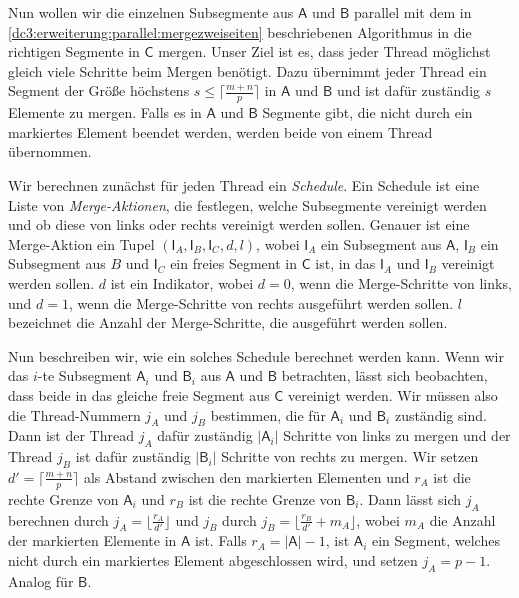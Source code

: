 Nun wollen wir die einzelnen Subsegmente aus $\mathsf{A}$ und $\mathsf{B}$ parallel mit dem in \cref{dc3:erweiterung:parallel:mergezweiseiten} beschriebenen Algorithmus in die richtigen Segmente in $\mathsf{C}$ mergen. Unser Ziel ist es, dass jeder Thread möglichst gleich viele Schritte beim Mergen benötigt. Dazu übernimmt jeder Thread ein Segment der Größe höchstens $s \le \lceil \frac{m+n}{p} \rceil$ in $\mathsf{A}$ und $\mathsf{B}$ und ist dafür zuständig $s$ Elemente zu mergen. Falls es in $\mathsf{A}$ und $\mathsf{B}$ Segmente gibt, die nicht durch ein markiertes Element beendet werden, werden beide von einem Thread übernommen. \par
Wir berechnen zunächst für jeden Thread ein \textit{Schedule}. Ein Schedule ist eine Liste von \textit{Merge-Aktionen}, die festlegen, welche Subsegmente vereinigt werden und ob diese von links oder rechts vereinigt werden sollen. Genauer ist eine Merge-Aktion ein Tupel $(\mathsf{I}_A, \mathsf{I}_B, \mathsf{I}_C, d, l)$, wobei $\mathsf{I}_A$ ein Subsegment aus $\mathsf{A}$, $\mathsf{I}_B$ ein Subsegment aus $B$ und $\mathsf{I}_C$ ein freies Segment in $\mathsf{C}$ ist, in das $\mathsf{I}_A$ und $\mathsf{I}_B$ vereinigt werden sollen. $d$ ist ein Indikator, wobei $d = 0$, wenn die Merge-Schritte von links, und $d = 1$, wenn die Merge-Schritte von rechts ausgeführt werden sollen. $l$ bezeichnet die Anzahl der Merge-Schritte, die ausgeführt werden sollen. \par
Nun beschreiben wir, wie ein solches Schedule berechnet werden kann. Wenn wir das $i$-te Subsegment $\mathsf{A}_i$ und $\mathsf{B}_i$ aus $\mathsf{A}$ und $\mathsf{B}$ betrachten, lässt sich beobachten, dass beide in das gleiche freie Segment aus $\mathsf{C}$ vereinigt werden. Wir müssen also die Thread-Nummern $j_A$ und $j_B$ bestimmen, die für $\mathsf{A}_i$ und $\mathsf{B}_i$ zuständig sind. Dann ist der Thread $j_A$ dafür zuständig $|\mathsf{A}_i|$ Schritte von links zu mergen und der Thread $j_B$ ist dafür zuständig $|\mathsf{B}_i|$ Schritte von rechts zu mergen. Wir setzen $d' = \lceil \frac{m+n}{p} \rceil$ als Abstand zwischen den markierten Elementen und $r_A$ ist die rechte Grenze von $\mathsf{A}_i$ und $r_B$ ist die rechte Grenze von $\mathsf{B}_i$. Dann lässt sich $j_A$ berechnen durch $j_A = \lfloor \frac{r_A}{d'} \rfloor$ und $j_B$ durch $j_B = \lfloor \frac{r_B}{d'}+m_A \rfloor$, wobei $m_A$ die Anzahl der markierten Elemente in $\mathsf{A}$ ist. Falls $r_A = |\mathsf{A}|-1$, ist $\mathsf{A}_i$ ein Segment, welches nicht durch ein markiertes Element abgeschlossen wird, und setzen $j_A = p-1$. Analog für $\mathsf{B}$. \par
